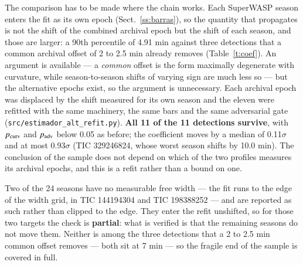 \documentclass{aa}
\begin{document}
The comparison has to be made where the chain works. Each SuperWASP season enters the fit as its own epoch (Sect.~\ref{ss:barras}), so the quantity that propagates is not the shift of the combined archival epoch but the shift of each season, and those are larger: a 90th percentile of 4.91 min against three detections that a common archival offset of 2 to 2.5 min already removes (Table~\ref{t:coef}). An argument is available --- a \textit{common} offset is the form maximally degenerate with curvature, while season-to-season shifts of varying sign are much less so --- but the alternative epochs exist, so the argument is unnecessary. Each archival epoch was displaced by the shift measured for its own season and the eleven were refitted with the same machinery, the same bars and the same adversarial gate (\texttt{src/\allowbreak estimador\_\allowbreak alt\_\allowbreak refit.py}). \textbf{All 11 of the 11 detections survive}, with $p_{\rm curv}$ and $p_{\rm adv}$ below 0.05 as before; the coefficient moves by a median of 0.11$\sigma$ and at most 0.93$\sigma$ (TIC 329246824, whose worst season shifts by 10.0 min). The conclusion of the sample does not depend on which of the two profiles measures its archival epochs, and this is a refit rather than a bound on one.

Two of the 24 seasons have no measurable free width --- the fit runs to the edge of the width grid, in TIC 144194304 and TIC 198388252 --- and are reported as such rather than clipped to the edge. They enter the refit unshifted, so for those two targets the check is \textbf{partial}: what is verified is that the remaining seasons do not move them. Neither is among the three detections that a 2 to 2.5 min common offset removes --- both sit at 7 min --- so the fragile end of the sample is covered in full.
\end{document}
